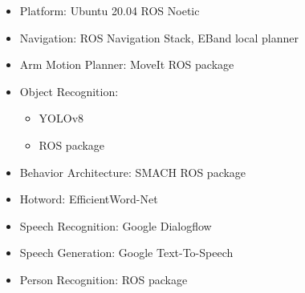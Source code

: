 \begin{itemize}
	\item Platform: Ubuntu 20.04 ROS Noetic
	\item Navigation: ROS Navigation Stack, EBand local planner
	\item Arm Motion Planner: MoveIt ROS package
	\item Object Recognition:
	      \begin{itemize}
		      \item YOLOv8
		      \item {} ROS package
	      \end{itemize}
	\item Behavior Architecture: SMACH ROS package
	\item Hotword: EfficientWord-Net
	\item Speech Recognition: Google Dialogflow
	\item Speech Generation: Google Text-To-Speech
	\item Person Recognition:  ROS package
\end{itemize}
